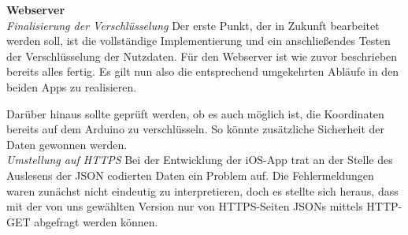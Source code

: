 \textbf{Webserver} 
\\
\textit{Finalisierung der Verschlüsselung}
Der erste Punkt, der in Zukunft bearbeitet werden soll, ist die vollständige Implementierung und ein anschließendes Testen der Verschlüsselung der Nutzdaten. Für den Webserver ist wie zuvor beschrieben bereits alles fertig. Es gilt nun also die entsprechend umgekehrten Abläufe in den beiden Apps zu realisieren.

Darüber hinaus sollte geprüft werden, ob es auch möglich ist, die Koordinaten bereits auf dem Arduino zu verschlüsseln. So könnte zusätzliche Sicherheit der Daten gewonnen werden.
\\
\textit{Umstellung auf HTTPS}
Bei der Entwicklung der iOS-App trat an der Stelle des Auslesens der JSON codierten Daten ein Problem auf. Die Fehlermeldungen waren zunächst nicht eindeutig zu interpretieren, doch es stellte sich heraus, dass mit der von uns gewählten Version nur von HTTPS-Seiten JSONs mittels HTTP-GET abgefragt werden können.

